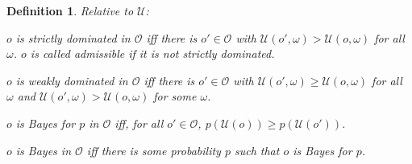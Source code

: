 \documentclass[a4paper]{article}
\newtheorem{definition}{Definition}
\newcommand\Exp{\mathsf{Exp}}
\renewcommand\O{\mathcal{O}}
\newcommand\Uwald{\mathcal{U}} %
\renewcommand{\Re}{\mathbb{R}}
\newcommand\SetDelimiter[1][]{
	\nonscript\,#1\vert \allowbreak \nonscript\,\mathopen{}}
\providecommand\given{\SetDelimiter}
\renewcommand{\geq}{\geqslant}
\newenvironment{CCM rewritten}
{\begingroup\color{blue}} %
{\endgroup}              %
\begin{document}
















%






\begin{definition}
Relative to $\Uwald$:

	$o$ is \emph{strictly dominated in $\O$} iff there is $o'\in\O$ with $\Uwald(o',\omega)>\Uwald(o,\omega)$ for all $\omega$. $o$ is called \emph{admissible} if it is not strictly dominated. 
	
	$o$ is \emph{weakly dominated in $\O$} iff there is $o'\in\O$ with $\Uwald(o',\omega)\geq\Uwald(o,\omega)$ for all $\omega$ and $\Uwald(o',\omega)>\Uwald(o,\omega)$ for some $\omega$.
	
	$o$ is \emph{Bayes for $p$ in $\O$}  iff, for all $o'\in\O$, $p(\Uwald(o))\geq p(\Uwald(o'))$. 
	
	$o$ is \emph{Bayes in $\O$} iff there is some probability $p$ such that $o$ is Bayes for $p$. %
\end{definition}
\end{document}

